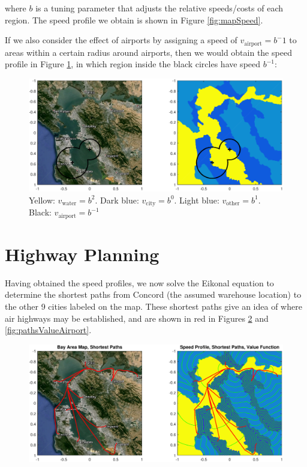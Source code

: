 \documentclass[12pt,draftcls,onecolumn]{IEEEtran}
\numberwithin{algorithm}{section}
\begin{document}
\noindent where $b$ is a tuning parameter that adjusts the relative speeds/costs of each region. The speed profile we obtain is shown in Figure \ref{fig:mapSpeed}.

If we also consider the effect of airports by assigning a speed of $v_{\text{airport}}=b^-1$ to areas within a certain radius around airports, then we would obtain the speed profile in Figure \ref{fig:mapSpeedAirport}, in which region inside the black circles have speed $b^{-1}$:
\begin{figure}
	\centering
	\includegraphics[width=\textwidth]{"fig/mapSpeedAirport"}
	\caption{Yellow: $v_{\text{water}} = b^2$. Dark blue: $v_{\text{city}} = b^0$. Light blue: $v_{\text{other}} = b^1$. Black: $v_{\text{airport}} = b^{-1}$}
	\label{fig:mapSpeedAirport}
\end{figure}

\section{Highway Planning}
Having obtained the speed profiles, we now solve the Eikonal equation to determine the shortest paths from Concord (the assumed warehouse location) to the other 9 cities labeled on the map. These shortest paths give an idea of where air highways may be established, and are shown in red in Figures \ref{fig:pathsValue} and \ref{fig:pathsValueAirport}.

\begin{figure}
	\centering
	\includegraphics[width=\textwidth]{"fig/pathsValue"}
	\caption{}
	\label{fig:pathsValue}
\end{figure}
\end{document}
